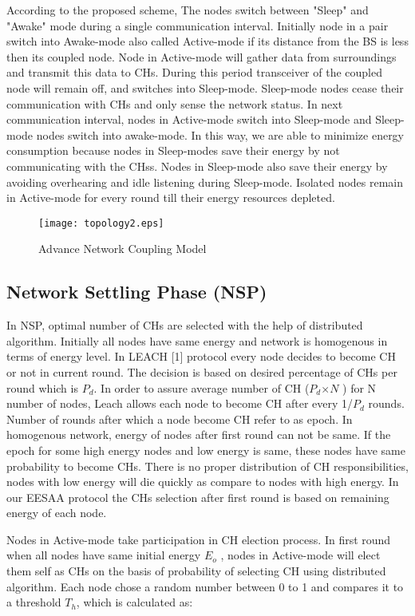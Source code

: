 \documentclass[journal]{IEEEtran}
\begin{document}
According to the proposed scheme, The nodes switch between "Sleep" and "Awake" mode during a single communication interval. Initially node in a pair switch into Awake-mode also called Active-mode if its distance from the BS is less then its coupled node. Node in Active-mode will gather data from surroundings and transmit this data to CHs. During this period transceiver of the coupled node will remain off, and switches into Sleep-mode. Sleep-mode nodes cease their communication with CHs and only sense the network status. In next communication interval,  nodes in Active-mode switch into Sleep-mode and Sleep-mode nodes switch into awake-mode. In this way, we are able to minimize energy consumption because nodes in Sleep-modes save their energy by not communicating with the CHss. Nodes in Sleep-mode also save their energy by avoiding overhearing and idle listening during Sleep-mode. Isolated nodes remain in Active-mode for every round till their energy resources depleted.

\begin{figure*}[t]
\centering
\texttt{[image: topology2.eps]}
\caption{Advance Network Coupling Model}\label{Figure 1}
\end{figure*}

\subsection{Network Settling Phase (NSP)}
In NSP, optimal number of CHs are selected with the help of distributed algorithm. Initially all nodes have same energy and network is homogenous in terms of energy level. In LEACH [1] protocol every node decides to become CH or not in current round. The decision is based on desired percentage of CHs per round which is $P_{d}$. In order to assure average number of CH ($P_{d}$$\times N$  ) for N number of nodes, Leach allows each node to become CH after every 1/$P_{d}$ rounds. Number of rounds after which a node become CH refer to as epoch. In homogenous network, energy of nodes after first round can not be same. If the epoch for some high energy nodes and low energy is same, these nodes have same probability to become CHs. There is no proper distribution of CH responsibilities, nodes with low energy will die quickly as compare to nodes with high energy. In our EESAA protocol the CHs selection after first round is based on remaining energy of each node.

Nodes in Active-mode take participation in CH election process. In first round when all nodes have same initial energy $E_{o}$ , nodes in Active-mode will elect them self as CHs on the basis of probability of selecting CH using distributed algorithm. Each node chose a random number between 0 to 1 and compares it to a threshold $T_{h}$, which is calculated as:
\end{document}
